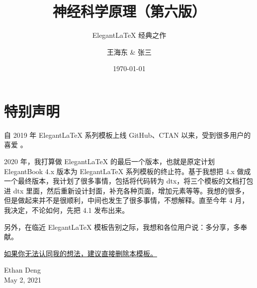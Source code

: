 \documentclass[cn,10pt,citestyle=gb7714-2015, bibstyle=gb7714-2015]{elegantbook}
\title{神经科学原理（第六版）}
\subtitle{Elegant\LaTeX{} 经典之作}
\author{王海东 \& 张三}
\institute{Elegant\LaTeX{} Program}
\date{\today}
\numberwithin{figure}{section}
\begin{document}
\maketitle
\frontmatter

\chapter*{特别声明}


自 2019 年 Elegant\LaTeX{} 系列模板上线 GitHub、CTAN 以来，受到很多用户的喜爱 \cite{nieuwenhuys2007human}。

2020 年，我打算做 Elegant\LaTeX{} 的最后一个版本，也就是原定计划 ElegantBook 4.x 版本为 Elegant\LaTeX{} 系列模板的终止符。基于我想把 4.x 做成一个最终版本，我计划了很多事情，包括将代码转为 dtx，将三个模板的文档打包进 dtx 里面，然后重新设计封面，补充各种页面，增加元素等等。我想的很多，但是做起来并不是很顺利，中间也发生了很多事情，不想解释。直至今年 4 月，我决定，不论如何，先把 4.1 发布出来。

\vskip 0.5cm

另外，在临近 Elegant\LaTeX{} 模板告别之际，我想和各位用户说：多分享，多奉献。
\vskip 0.5cm

\underline{如果你无法认同我的想法，建议直接删除本模板。}

\vskip 1.5cm

\begin{flushright}
Ethan Deng\\
May 2, 2021
\end{flushright}

\tableofcontents

\mainmatter












































\end{document}
